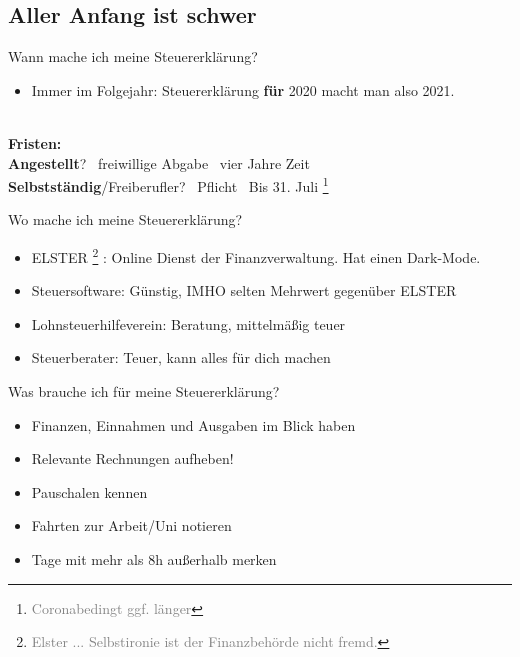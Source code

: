 \documentclass{beamer}
\newcommand{\n}{\hfill\\\vspace{0.25cm}}
\let\oldfootnote\footnote
\renewcommand{\footnote}[1]
{%
	\oldfootnote
	{
		\tiny
		\textcolor{gray}{#1}
	}%
}
\begin{document}
		\subsection{Aller Anfang ist schwer}
		
			\begin{frame}{Wann mache ich meine Steuererklärung?}
				\begin{itemize}
					\item Immer im Folgejahr: Steuererklärung \textbf{für} 2020 macht man also 2021.
				\end{itemize}\n
				\textbf{Fristen:}\\
				\textbf{Angestellt}? \textrightarrow\ freiwillige Abgabe \textrightarrow\ vier Jahre Zeit\\
				\textbf{Selbstständig}/Freiberufler? \textrightarrow\ Pflicht \textrightarrow\ Bis 31. Juli\footnote{Coronabedingt ggf. länger}
			\end{frame}

			\begin{frame}{Wo mache ich meine Steuererklärung?}
				\begin{itemize}
					\item ELSTER\footnote{Elster ... Selbstironie ist der Finanzbehörde nicht fremd.}: Online Dienst der Finanzverwaltung. Hat einen Dark-Mode.
					\item Steuersoftware: Günstig, IMHO selten Mehrwert gegenüber ELSTER
					\item Lohnsteuerhilfeverein: Beratung, mittelmäßig teuer
					\item Steuerberater: Teuer, kann alles für dich machen
				\end{itemize}
			\end{frame}
		
			\begin{frame}{Was brauche ich für meine Steuererklärung?}
				\begin{itemize}
					\item Finanzen, Einnahmen und Ausgaben im Blick haben
					\item Relevante Rechnungen aufheben!
					\item Pauschalen kennen
					\item Fahrten zur Arbeit/Uni notieren
					\item Tage mit mehr als 8h außerhalb merken
				\end{itemize}
			\end{frame}
		
\end{document}
